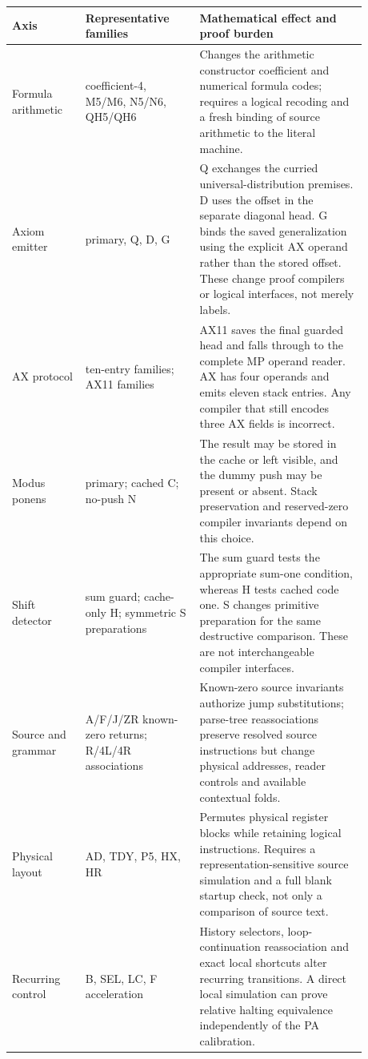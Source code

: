 \begin{center}
\small
\begin{tabular}{p{0.18\linewidth}p{0.29\linewidth}p{0.41\linewidth}}
\toprule
Axis & Representative families & Mathematical effect and proof burden\\
\midrule
Formula arithmetic & coefficient-4, M5/M6, N5/N6, QH5/QH6 &
Changes the arithmetic constructor coefficient and numerical formula codes;
requires a logical recoding and a fresh binding of source arithmetic to the
literal machine.\\
\addlinespace
Axiom emitter & primary, Q, D, G &
Q exchanges the curried universal-distribution premises. D uses the offset
in the separate diagonal head. G binds the saved generalization using the
explicit AX operand rather than the stored offset. These change proof
compilers or logical interfaces, not merely labels.\\
\addlinespace
AX protocol & ten-entry families; AX11 families &
AX11 saves the final guarded head and falls through to the complete MP
operand reader. AX has four operands and emits eleven stack entries. Any
compiler that still encodes three AX fields is incorrect.\\
\addlinespace
Modus ponens & primary; cached C; no-push N &
The result may be stored in the cache or left visible, and the dummy push
may be present or absent. Stack preservation and reserved-zero compiler
invariants depend on this choice.\\
\addlinespace
Shift detector & sum guard; cache-only H; symmetric S preparations &
The sum guard tests the appropriate sum-one condition, whereas H tests
cached code one. S changes primitive preparation for the same destructive
comparison. These are not interchangeable compiler interfaces.\\
\addlinespace
Source and grammar & A/F/J/ZR known-zero returns; R/4L/4R associations &
Known-zero source invariants authorize jump substitutions; parse-tree
reassociations preserve resolved source instructions but change physical
addresses, reader controls and available contextual folds.\\
\addlinespace
Physical layout & AD, TDY, P5, HX, HR &
Permutes physical register blocks while retaining logical instructions.
Requires a representation-sensitive source simulation and a full blank
startup check, not only a comparison of source text.\\
\addlinespace
Recurring control & B, SEL, LC, F acceleration &
History selectors, loop-continuation reassociation and exact local
shortcuts alter recurring transitions. A direct local simulation can prove
relative halting equivalence independently of the PA calibration.\\
\bottomrule
\end{tabular}
\end{center}

